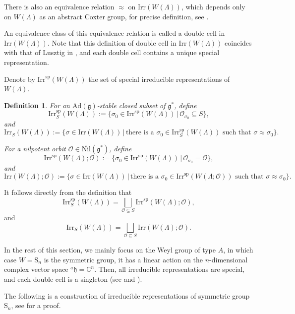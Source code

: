 \documentclass[12pt, a4paper]{amsart}
\numberwithin{equation}{section}
\newtheorem{defn}[thm]{Definition}
\newcommand{\BC}{{\mathbb {C}}}
\newcommand{\CO}{{\mathcal {O}}}
\newcommand{\fg}{\mathfrak{g}}
\newcommand{\fh}{\mathfrak{h}}
\newcommand{\Irr}{{\mathrm{Irr}}}
\newcommand{\Ad}{{\mathrm{Ad}}}
\newcommand{\Nil}{{\mathrm{Nil}}}
\newcommand{\set}[2]{\{#1\,|\,#2\}}
\renewcommand{\bar}{\overline}
\begin{document}
There is also an equivalence relation $\approx$ on $\Irr(W(\Lambda))$, which depends only on $W(\Lambda)$ as an abstract Coxter group, for precise definition, see \cite[Chapter 3]{BMSZ}. 

An equivalence class of this equivalence relation is called a double cell in $\Irr(W(\Lambda))$. Note that this definition of double cell in $\Irr(W(\Lambda))$ coincides with that of Lusztig in \cite{Lus82}, and each double cell contains a unique special representation.

Denote by $\Irr^{\mathrm{sp}}(W(\Lambda))$ the set of special irreducible representations of $W(\Lambda)$.

\begin{defn}
    For an $\Ad(\fg)$-stable closed subset of $\fg^*$, define
    $$\Irr^{\mathrm{sp}}_{S}(W(\Lambda)) := \set{\sigma_0 \in \Irr^{\mathrm{sp}}(W(\Lambda))}{\CO_{\sigma_0} \subseteq S},$$
    and
    $$\Irr_{S}(W(\Lambda)) := \set{\sigma \in \Irr(W(\Lambda))}{\textrm{there is a $\sigma_0 \in \Irr^{\mathrm{sp}}_S(W(\Lambda))$ such that $\sigma \approx \sigma_0$}}.$$

    For a nilpotent orbit $\CO \in \bar{\Nil}(\fg^*)$, define
    $$\Irr^{\mathrm{sp}}(W(\Lambda);\CO) := \set{\sigma_0 \in \Irr^{\mathrm{sp}}(W(\Lambda))}{\CO_{\sigma_0} = \CO},$$
    and
    $$\Irr(W(\Lambda);\CO) := \set{\sigma \in \Irr(W(\Lambda))}{\textrm{there is a $\sigma_0 \in \Irr^{\mathrm{sp}}(W(\Lambda;\CO))$ such that $\sigma \approx \sigma_0$}}.$$
\end{defn}

It follows directly from the definition that
\begin{equation}
    \Irr_{S}^{\mathrm{sp}}(W(\Lambda)) = \bigsqcup_{\CO \subseteq S} \Irr^{\mathrm{sp}}(W(\Lambda);\CO),
\end{equation}
and 
\begin{equation}\label{(2.16)}
    \Irr_{S}(W(\Lambda)) = \bigsqcup_{\CO \subseteq S}\Irr(W(\Lambda);\CO).
\end{equation}

In the rest of this section, we mainly focus on the Weyl group of type $A$, in which case $W = \mathrm{S}_n$ is the symmetric group, it has a linear action on the $n$-dimensional complex vector space $^{a}\fh = \BC^n$. Then, all irreducible representations are special, and each double cell is a singleton (see \cite{Lus79} and \cite{Lus82}).

The following is a construction of irreducible representations of symmetric group $\mathrm{S}_n$, see \cite[Chapter 5.4]{GP} for a proof.
\end{document}
